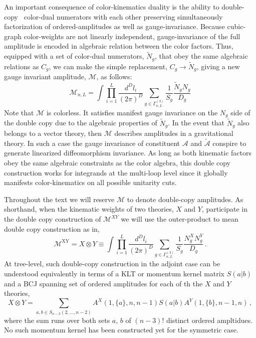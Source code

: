 \documentclass[11pt,letter]{article}
\begin{document}
An important consequence of color-kinematics duality is the  ability to double-copy~\cite{BCJ} color-dual numerators with each other preserving simultaneously factorization of ordered-amplitudes as well as gauge-invariance.  Because cubic-graph color-weights are not linearly independent, gauge-invariance of the full amplitude is encoded in algebraic relation between the color factors. Thus, equipped with a set of color-dual numerators, $\tilde{N}_g$, that obey the same algebraic relations as $C_g$, we can make the simple replacement, $C_g \rightarrow \tilde{N}_g$, giving a new gauge invariant amplitude, $\mathcal{M}$, as follows:
\begin{equation}\label{fullAmpCubicDouble}
\mathcal{M}_{n,L} = \int \prod_{i=1}^L\frac{d^D l_i}{(2\pi)^D} \sum_{g\in \Gamma^{(3)}_{n,L}} \frac{1}{S_g}\frac{\tilde{N}_gN_g}{D_g}
\end{equation}
Note that $\mathcal{M}$ is colorless. It satisfies manifest gauge invariance on the $N_g$ side of the double copy due to the algebraic properties of $\tilde{N}_g$. In the event that $\tilde{N}_g$ also belongs to a vector theory, then $\mathcal{M}$ describes amplitudes in a gravitational theory. In such a case the gauge invariance of constituent $\mathcal{A}$ and $\tilde{\mathcal{A}}$ conspire to generate linearized diffeomorphism invariance.  As long as both kinematic factors obey the same algebraic constraints as the color algebra, this double copy construction works for integrands at the multi-loop level since it globally manifests color-kinematics on all possible unitarity cuts. 


Throughout the text we will reserve $\mathcal{M}$ to denote double-copy amplitudes.  As shorthand, when the kinematic weights of two theories, $X$ and $Y$, participate in the double copy construction of $\mathcal{M}^{XY}$ we will use the outer-product to mean double copy construction as in,
\begin{equation}
\mathcal{M}^{\text{XY}} = X \otimes Y \equiv \int \prod_{i=1}^L\frac{d^D l_i}{(2\pi)^D} \sum_{g\in \Gamma^{(3)}_{n,L}} \frac{1}{S_g}\frac{N^X_gN^Y_g}{D_g}\,.
\end{equation}
At tree-level, such double-copy construction in the adjoint case can be understood equivalently \cite{Bern:1998sv,Vaman:2010ez,Bjerrum-Bohr:2010diw,Bjerrum-Bohr:2010kyi,Bjerrum-Bohr:2010pnr,Bjerrum-Bohr:2012kaa} in terms of a KLT or momentum kernel matrix $S(a|b)$ and a BCJ spanning set of ordered amplitudes for each of th the $X$ and $Y$ theories,
\begin{equation}
 X \otimes Y = \sum_{a,b \in S_{n-3}(2,\ldots,n-2)} A^X(1,\{a\},n,n-1) S(a|b) A^Y(1,\{b\},n-1,n)\,,
\end{equation}
where the sum runs over both sets $a$, $b$ of $(n-3)!$ distinct ordered ampltidues.  No such momentum kernel has been constructed yet for the symmetric case.
\end{document}
